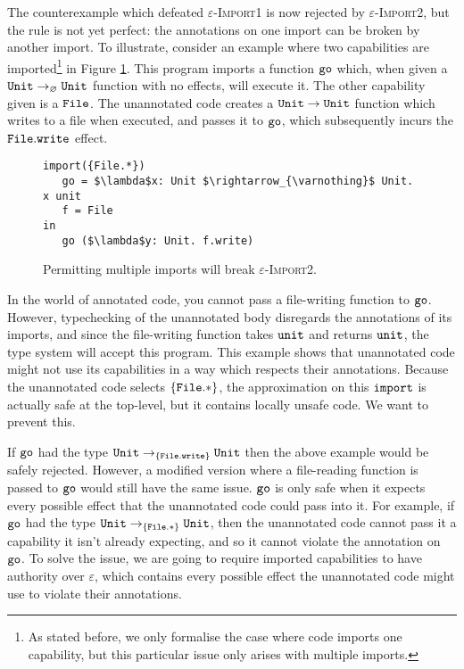 The counterexample which defeated \textsc{$\varepsilon$-Import1} is now rejected by \textsc{$\varepsilon$-Import2}, but the rule is not yet perfect: the annotations on one import can be broken by another import. To illustrate, consider an example where two capabilities are imported\footnote{As stated before, we only formalise the case where code imports one capability, but this particular issue only arises with multiple imports.} in Figure \ref{fig:rule_import2_counterexample}. This program imports a function $\mathtt{go}$ which, when given a $\mathtt{Unit} \rightarrow_{\varnothing} \mathtt{Unit}$ function with no effects, will execute it. The other capability given is a $\mathtt{File}$. The unannotated code creates a $\mathtt{Unit} \rightarrow \mathtt{Unit}$ function which writes to a file when executed, and passes it to $\mathtt{go}$, which subsequently incurs the $\mathtt{File.write}$ effect.

\begin{figure}[h]

\begin{lstlisting}
import({File.*})
   go = $\lambda$x: Unit $\rightarrow_{\varnothing}$ Unit. x unit
   f = File
in
   go ($\lambda$y: Unit. f.write)

\end{lstlisting}

\vspace{-7pt}
\caption{Permitting multiple imports will break \textsc{$\varepsilon$-Import2}.}
\label{fig:rule_import2_counterexample}
\end{figure}

In the world of annotated code, you cannot pass a file-writing function to $\mathtt{go}$. However, typechecking of the unannotated body disregards the annotations of its imports, and since the file-writing function takes $\mathtt{unit}$ and returns $\mathtt{unit}$, the type system will accept this program. This example shows that unannotated code might not use its capabilities in a way which respects their annotations. Because the unannotated code selects $\{ \mathtt{File.*} \}$, the approximation on this $\mathtt{import}$ is actually safe at the top-level, but it contains locally unsafe code. We want to prevent this.

If $\mathtt{go}$ had the type $\mathtt{Unit} \rightarrow_{\{ \mathtt{File.write} \}} \mathtt{Unit}$ then the above example would be safely rejected. However, a modified version where a file-reading function is passed to $\mathtt{go}$ would still have the same issue. $\mathtt{go}$ is only safe when it expects every possible effect that the unannotated code could pass into it. For example, if $\mathtt{go}$ had the type $\mathtt{Unit} \rightarrow_{\{ \mathtt{File.*} \}} \mathtt{Unit}$, then the unannotated code cannot pass it a capability it isn't already expecting, and so it cannot violate the annotation on $\mathtt{go}$. To solve the issue, we are going to require imported capabilities to have authority over $\varepsilon$, which contains every possible effect the unannotated code might use to violate their annotations.

